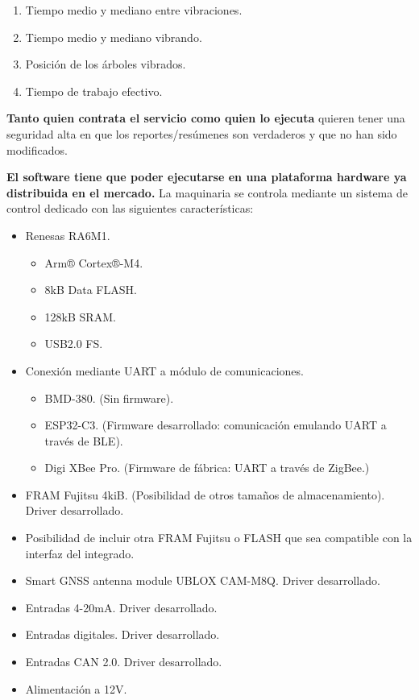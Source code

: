 \begin{enumerate}
   \item Tiempo medio y mediano entre vibraciones.
   \item Tiempo medio y mediano vibrando.
   \item Posición de los árboles vibrados.
   \item Tiempo de trabajo efectivo.
\end{enumerate}

\textbf{Tanto quien contrata el servicio como quien lo ejecuta} quieren tener una seguridad alta
en que los reportes/resúmenes son verdaderos y que no han sido modificados.

\textbf{El software tiene que poder ejecutarse en una plataforma hardware ya distribuida en el mercado.}
La maquinaria se controla mediante un sistema de control dedicado con las siguientes características:

\begin{itemize}
   \item Renesas RA6M1.
   \begin{itemize}
      \item Arm® Cortex®-M4.
      \item 8kB Data FLASH.
      \item 128kB SRAM.
      \item USB2.0 FS.
   \end{itemize}
   \item Conexión mediante UART a módulo de comunicaciones.
   \begin{itemize}
      \item BMD-380. (Sin firmware).
      \item ESP32-C3. (Firmware desarrollado: comunicación emulando UART a través de
      BLE).
      \item Digi XBee Pro. (Firmware de fábrica: UART a través de ZigBee.)
   \end{itemize}
   \item FRAM Fujitsu 4kiB. (Posibilidad de otros tamaños de almacenamiento). Driver
   desarrollado.
   \item Posibilidad de incluir otra FRAM Fujitsu o FLASH que sea compatible con la
   interfaz del integrado.
   \item Smart GNSS antenna module UBLOX CAM-M8Q. Driver desarrollado.
   \item Entradas 4-20mA. Driver desarrollado.
   \item Entradas digitales. Driver desarrollado.
   \item Entradas CAN 2.0. Driver desarrollado.
   \item Alimentación a 12V.
\end{itemize}


